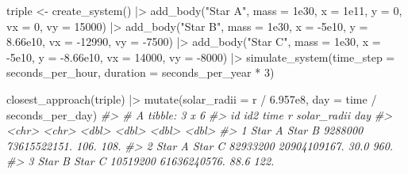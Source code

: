 \documentclass[
  10.5pt,
  letterpaper,
]{scrbook}
\newenvironment{Shaded}{\begin{snugshade}}{\end{snugshade}}
\newcommand{\AttributeTok}[1]{\textcolor[rgb]{0.00,0.00,0.00}{#1}}
\newcommand{\CommentTok}[1]{\textcolor[rgb]{0.00,0.00,0.00}{\textit{#1}}}
\newcommand{\DecValTok}[1]{\textcolor[rgb]{0.00,0.00,0.00}{#1}}
\newcommand{\FloatTok}[1]{\textcolor[rgb]{0.00,0.00,0.00}{#1}}
\newcommand{\FunctionTok}[1]{\textcolor[rgb]{0.00,0.00,0.00}{#1}}
\newcommand{\NormalTok}[1]{\textcolor[rgb]{0.00,0.00,0.00}{#1}}
\newcommand{\OtherTok}[1]{\textcolor[rgb]{0.00,0.00,0.00}{#1}}
\newcommand{\SpecialCharTok}[1]{\textcolor[rgb]{0.00,0.00,0.00}{#1}}
\newcommand{\StringTok}[1]{\textcolor[rgb]{0.00,0.00,0.00}{#1}}
\theoremstyle{definition}
\theoremstyle{plain}
\theoremstyle{remark}
\begin{document}
\begin{Shaded}
\begin{Highlighting}[]
\NormalTok{triple }\OtherTok{\textless{}{-}} \FunctionTok{create\_system}\NormalTok{() }\SpecialCharTok{|\textgreater{}}
  \FunctionTok{add\_body}\NormalTok{(}\StringTok{"Star A"}\NormalTok{, }\AttributeTok{mass =} \FloatTok{1e30}\NormalTok{, }\AttributeTok{x =} \FloatTok{1e11}\NormalTok{,  }\AttributeTok{y =} \DecValTok{0}\NormalTok{,        }\AttributeTok{vx =} \DecValTok{0}\NormalTok{,      }\AttributeTok{vy =} \DecValTok{15000}\NormalTok{) }\SpecialCharTok{|\textgreater{}}
  \FunctionTok{add\_body}\NormalTok{(}\StringTok{"Star B"}\NormalTok{, }\AttributeTok{mass =} \FloatTok{1e30}\NormalTok{, }\AttributeTok{x =} \SpecialCharTok{{-}}\FloatTok{5e10}\NormalTok{, }\AttributeTok{y =} \FloatTok{8.66e10}\NormalTok{,  }\AttributeTok{vx =} \SpecialCharTok{{-}}\DecValTok{12990}\NormalTok{, }\AttributeTok{vy =} \SpecialCharTok{{-}}\DecValTok{7500}\NormalTok{) }\SpecialCharTok{|\textgreater{}}
  \FunctionTok{add\_body}\NormalTok{(}\StringTok{"Star C"}\NormalTok{, }\AttributeTok{mass =} \FloatTok{1e30}\NormalTok{, }\AttributeTok{x =} \SpecialCharTok{{-}}\FloatTok{5e10}\NormalTok{, }\AttributeTok{y =} \SpecialCharTok{{-}}\FloatTok{8.66e10}\NormalTok{, }\AttributeTok{vx =} \DecValTok{14000}\NormalTok{,  }\AttributeTok{vy =} \SpecialCharTok{{-}}\DecValTok{8000}\NormalTok{) }\SpecialCharTok{|\textgreater{}}
  \FunctionTok{simulate\_system}\NormalTok{(}\AttributeTok{time\_step =}\NormalTok{ seconds\_per\_hour, }\AttributeTok{duration =}\NormalTok{ seconds\_per\_year }\SpecialCharTok{*} \DecValTok{3}\NormalTok{)}

\FunctionTok{closest\_approach}\NormalTok{(triple) }\SpecialCharTok{|\textgreater{}}
  \FunctionTok{mutate}\NormalTok{(}\AttributeTok{solar\_radii =}\NormalTok{ r }\SpecialCharTok{/} \FloatTok{6.957e8}\NormalTok{, }\AttributeTok{day =}\NormalTok{ time }\SpecialCharTok{/}\NormalTok{ seconds\_per\_day)}
\CommentTok{\#\textgreater{} \# A tibble: 3 x 6}
\CommentTok{\#\textgreater{}   id     id2        time            r solar\_radii   day}
\CommentTok{\#\textgreater{}   \textless{}chr\textgreater{}  \textless{}chr\textgreater{}     \textless{}dbl\textgreater{}        \textless{}dbl\textgreater{}       \textless{}dbl\textgreater{} \textless{}dbl\textgreater{}}
\CommentTok{\#\textgreater{} 1 Star A Star B  9288000 73615522151.       106.   108.}
\CommentTok{\#\textgreater{} 2 Star A Star C 82933200 20904109167.        30.0  960.}
\CommentTok{\#\textgreater{} 3 Star B Star C 10519200 61636240576.        88.6  122.}
\end{Highlighting}
\end{Shaded}
\end{document}
